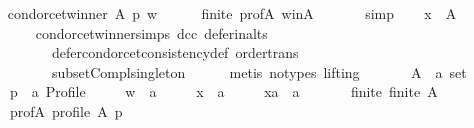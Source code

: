 \begin{isabellebody}
\ \ \isamarkupfalse%
\ {\isachardoublequoteopen}condorcet{\isacharunderscore}{\kern0pt}winner\ A\ p\ w{\isachardoublequoteclose}\isanewline
\ \ \ \ \isamarkupfalse%
\ finite\ prof{\isacharunderscore}{\kern0pt}A\ w{\isacharunderscore}{\kern0pt}in{\isacharunderscore}{\kern0pt}A\ {\isachardoublequoteopen}{}{\isachardoublequoteclose}\isanewline
\ \ \ \ \isamarkupfalse%
\ simp\isanewline
\ \ \isamarkupfalse%
\ {\isachardoublequoteopen}x\ {\isasymin}\ A{\isachardoublequoteclose}\isanewline
\ \ \ \ \isamarkupfalse%
\ {\isachardoublequoteopen}{}{\isachardoublequoteclose}\ {\isachardoublequoteopen}{}{\isachardoublequoteclose}\ condorcet{\isacharunderscore}{\kern0pt}winner{\isachardot}{\kern0pt}simps\ dcc\ defer{\isacharunderscore}{\kern0pt}in{\isacharunderscore}{\kern0pt}alts\isanewline
\ \ \ \ \ \ \ \ \ \ defer{\isacharunderscore}{\kern0pt}condorcet{\isacharunderscore}{\kern0pt}consistency{\isacharunderscore}{\kern0pt}def\ order{\isacharunderscore}{\kern0pt}trans\isanewline
\ \ \ \ \ \ \ \ \ \ subset{\isacharunderscore}{\kern0pt}Compl{\isacharunderscore}{\kern0pt}singleton\isanewline
\ \ \ \ \isamarkupfalse%
\ {\isacharparenleft}{\kern0pt}metis\ {\isacharparenleft}{\kern0pt}no{\isacharunderscore}{\kern0pt}types{\isacharcomma}{\kern0pt}\ lifting{\isacharparenright}{\kern0pt}{\isacharparenright}{\kern0pt}\isanewline
{}\isamarkupfalse%
\isanewline
\ \ \isamarkupfalse%
\isanewline
\ \ \ \ A\ {\isacharcolon}{\kern0pt}{\isacharcolon}{\kern0pt}\ {\isachardoublequoteopen}{\isacharprime}{\kern0pt}a\ set{\isachardoublequoteclose}\ \isanewline
\ \ \ \ p\ {\isacharcolon}{\kern0pt}{\isacharcolon}{\kern0pt}\ {\isachardoublequoteopen}{\isacharprime}{\kern0pt}a\ Profile{\isachardoublequoteclose}\ \isanewline
\ \ \ \ w\ {\isacharcolon}{\kern0pt}{\isacharcolon}{\kern0pt}\ {\isachardoublequoteopen}{\isacharprime}{\kern0pt}a{\isachardoublequoteclose}\ \isanewline
\ \ \ \ x\ {\isacharcolon}{\kern0pt}{\isacharcolon}{\kern0pt}\ {\isachardoublequoteopen}{\isacharprime}{\kern0pt}a{\isachardoublequoteclose}\ \isanewline
\ \ \ \ xa\ {\isacharcolon}{\kern0pt}{\isacharcolon}{\kern0pt}\ {\isachardoublequoteopen}{\isacharprime}{\kern0pt}a{\isachardoublequoteclose}\isanewline
\ \ \isamarkupfalse%
\isanewline
\ \ \ \ finite{\isacharcolon}{\kern0pt}\ {\isachardoublequoteopen}finite\ A{\isachardoublequoteclose}\ \isanewline
\ \ \ \ prof{\isacharunderscore}{\kern0pt}A{\isacharcolon}{\kern0pt}\ {\isachardoublequoteopen}profile\ A\ p{\isachardoublequoteclose}\ \isanewline

\end{isabellebody}
